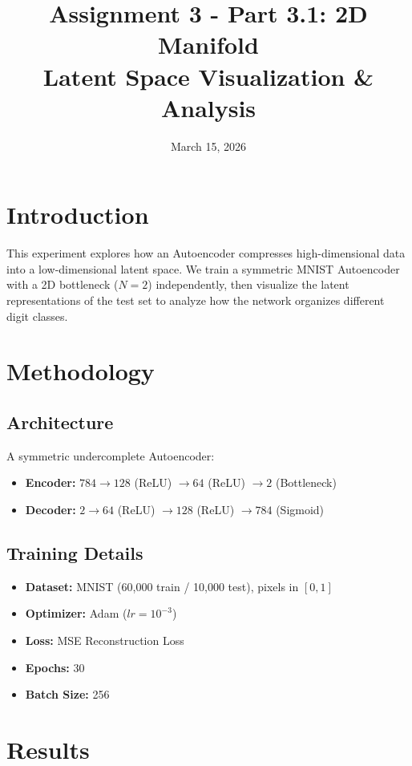 \documentclass{article}
\title{Assignment 3 - Part 3.1: 2D Manifold \\ Latent Space Visualization \& Analysis}
\date{March 15, 2026}
\begin{document}
\maketitle

\section{Introduction}
This experiment explores how an Autoencoder compresses high-dimensional data into a low-dimensional latent space. We train a symmetric MNIST Autoencoder with a 2D bottleneck ($N=2$) independently, then visualize the latent representations of the test set to analyze how the network organizes different digit classes.

\section{Methodology}

\subsection{Architecture}
A symmetric undercomplete Autoencoder:
\begin{itemize}
    \item \textbf{Encoder:} $784 \rightarrow 128$ (ReLU) $\rightarrow 64$ (ReLU) $\rightarrow 2$ (Bottleneck)
    \item \textbf{Decoder:} $2 \rightarrow 64$ (ReLU) $\rightarrow 128$ (ReLU) $\rightarrow 784$ (Sigmoid)
\end{itemize}

\subsection{Training Details}
\begin{itemize}
    \item \textbf{Dataset:} MNIST (60,000 train / 10,000 test), pixels in $[0,1]$
    \item \textbf{Optimizer:} Adam ($lr = 10^{-3}$)
    \item \textbf{Loss:} MSE Reconstruction Loss
    \item \textbf{Epochs:} 30
    \item \textbf{Batch Size:} 256
\end{itemize}

\section{Results}
\end{document}
